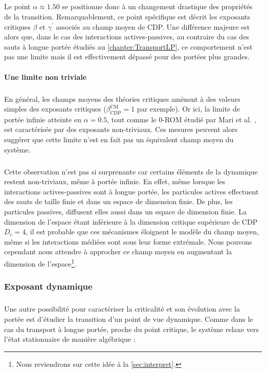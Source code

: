 \subparagraph{}Le point $\alpha\approx 1.50$ se positionne donc à un changement drastique des propriétés de la transition. Remarquablement, ce point spécifique est décrit les exposants critiques $\beta$ et $\gamma^\prime$ associés au champ moyen de CDP. Une différence majeure est alors que, dans le cas des interactions actives-passives, au contraire du cas des sauts à longue portée étudiés au \autoref{chapter:TransportLP}, ce comportement n'est pas une limite mais il est effectivement dépassé pour des portées plus grandes.

\paragraph{Une limite non triviale}

\subparagraph{}En général, les champs moyens des théories critiques amènent à des valeurs simples des exposants critiques ($\beta_\text{CDP}^\text{CM}=1$ par exemple). Or ici, la limite de portée infinie atteinte en $\alpha=0.5$, tout comme le 0-ROM étudié par Mari et al. \cite{mari_absorbing_2022}, est caractérisée par des exposants non-triviaux. Ces mesures peuvent alors suggérer que cette limite n'est en fait pas un équivalent champ moyen du système. 

\subparagraph{}Cette observation n'est pas si surprenante car certains éléments de la dynamique restent non-triviaux, même à portée infinie. En effet, même lorsque les interactions actives-passives sont à longue portée, les particules actives effectuent des sauts de taille finie et dans un espace de dimension finie. De plus, les particules passives, diffusent elles aussi dans un espace de dimension finie. La dimension de l'espace étant inférieure à la dimension critique supérieure de CDP $D_c = 4$, il est probable que ces mécanismes éloignent le modèle du champ moyen, même si les interactions médiées sont sous leur forme extrémale. Nous pouvons cependant nous attendre à approcher ce champ moyen en augmentant la dimension de l'espace\footnote{Nous reviendrons sur cette idée à la \autoref{sec:interpret}.}.

\subsubsection{Exposant dynamique}

\label{sec:TBLRRdyn}

\subparagraph{}Une autre possibilité pour caractériser la criticalité et son évolution avec la portée est d'étudier la transition d'un point de vue dynamique. Comme dans le cas du transport à longue portée, proche du point critique, le système relaxe vers l'état stationnaire de manière algébrique :

